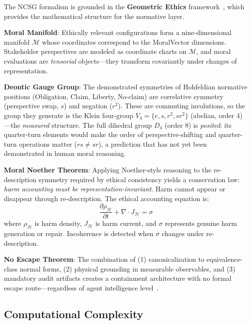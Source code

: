 \documentclass[conference]{IEEEtran}
\begin{document}
The NCSG formalism is grounded in the \textbf{Geometric Ethics} framework~\cite{bond2026ge}, which provides the mathematical structure for the normative layer.

\textbf{Moral Manifold}: Ethically relevant configurations form a nine-dimensional manifold $\mathcal{M}$ whose coordinates correspond to the MoralVector dimensions. Stakeholder perspectives are modeled as coordinate charts on $\mathcal{M}$, and moral evaluations are \emph{tensorial} objects---they transform covariantly under changes of representation.

\textbf{Deontic Gauge Group}: The demonstrated symmetries of Hohfeldian normative positions (Obligation, Claim, Liberty, No-claim) are correlative symmetry (perspective swap, $s$) and negation ($r^2$). These are commuting involutions, so the group they generate is the Klein four-group $V_4 = \{e, s, r^2, sr^2\}$ (abelian, order 4)---the \emph{measured} structure. The full dihedral group $D_4$ (order 8) is \emph{posited}: its quarter-turn elements would make the order of perspective-shifting and quarter-turn operations matter ($rs \neq sr$), a prediction that has not yet been demonstrated in human moral reasoning.

\textbf{Moral Noether Theorem}: Applying Noether-style reasoning to the re-description symmetry required by ethical consistency yields a conservation law: \emph{harm accounting must be representation-invariant}. Harm cannot appear or disappear through re-description. The ethical accounting equation is:
\begin{equation}
\frac{\partial \rho_\mathcal{H}}{\partial t} + \nabla \cdot J_\mathcal{H} = \sigma
\end{equation}
where $\rho_\mathcal{H}$ is harm density, $J_\mathcal{H}$ is harm current, and $\sigma$ represents genuine harm generation or repair. Incoherence is detected when $\sigma$ changes under re-description.

\textbf{No Escape Theorem}: The combination of (1) canonicalization to equivalence-class normal forms, (2) physical grounding in measurable observables, and (3) mandatory audit artifacts creates a containment architecture with no formal escape route---regardless of agent intelligence level~\cite{bond2026noescape}.

\subsection{Computational Complexity}
\end{document}
